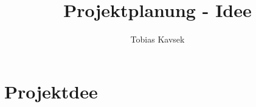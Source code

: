 \documentclass[11pt]{article}
\title{Projektplanung - Idee}
\author{Tobias Kavsek}
\begin{document}
\section{Projektdee}
\end{document}
